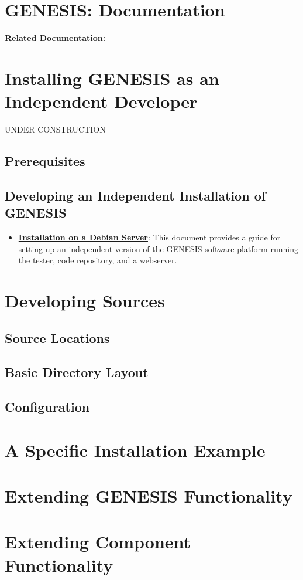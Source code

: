\documentclass[12pt]{article}
\begin{document}
\section*{GENESIS: Documentation}

{\bf Related Documentation:}

\section*{Installing GENESIS as an Independent Developer}

UNDER CONSTRUCTION

\subsection*{Prerequisites}

\subsection*{Developing an Independent Installation of GENESIS}

\begin{itemize}
   \item[]\href{../installation-debian-server/installation-debian-server.tex}{\bf Installation on a Debian Server}: This document provides a guide for setting up an independent version of the GENESIS software platform running the tester, code repository, and a webserver.
\end{itemize}

\section*{Developing Sources}

\subsection*{Source Locations}

\subsection*{Basic Directory Layout}

\subsection*{Configuration}

\section*{A Specific Installation Example}

\section*{Extending GENESIS Functionality}

\section*{Extending Component Functionality}
\end{document}
